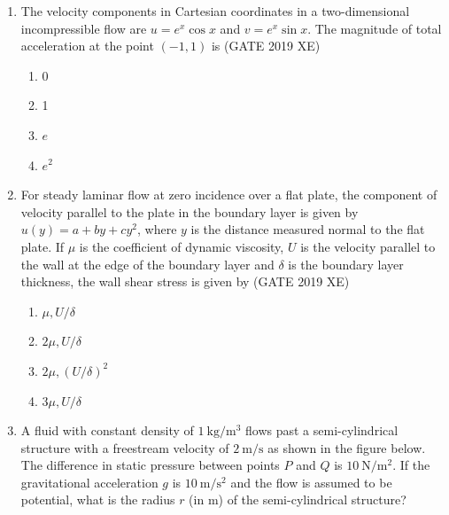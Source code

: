 \documentclass[journal,12pt,onecolumn]{IEEEtran}
\begin{document}
\begin{enumerate}
\item The velocity components in Cartesian coordinates in a two-dimensional incompressible flow are $u=e^{x}\cos x$ and $v=e^{x}\sin x$. The magnitude of total acceleration at the point $(-1,1)$ is
\hfill{(GATE 2019 XE)} \\
\begin{multicols}{2}
\begin{enumerate}
\item 0
\item 1
\item $e$
\item $e^2$
\end{enumerate}
\end{multicols}

\item For steady laminar flow at zero incidence over a flat plate, the component of velocity parallel to the plate in the boundary layer is given by $u(y)=a+b y+c y^2$, where $y$ is the distance measured normal to the flat plate. If $\mu$ is the coefficient of dynamic viscosity, $U$ is the velocity parallel to the wall at the edge of the boundary layer and $\delta$ is the boundary layer thickness, the wall shear stress is given by
\hfill{(GATE 2019 XE)} \\
\begin{multicols}{2}
\begin{enumerate}
\item $\mu,U/\delta$
\item $2\mu,U/\delta$
\item $2\mu,(U/\delta)^2$
\item $3\mu,U/\delta$
\end{enumerate}
\end{multicols}

\item A fluid with constant density of $1\ \mathrm{kg/m^3}$ flows past a semi-cylindrical structure with a freestream velocity of $2\ \mathrm{m/s}$ as shown in the figure below. The difference in static pressure between points $P$ and $Q$ is $10\ \mathrm{N/m^2}$. If the gravitational acceleration $g$ is $10\ \mathrm{m/s^2}$ and the flow is assumed to be potential, what is the radius $r$ (in m) of the semi-cylindrical structure?


\end{enumerate}
\end{document}
